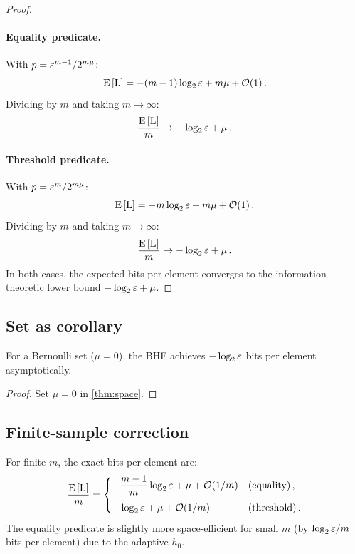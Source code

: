 \begin{proof}
\paragraph{Equality predicate.}
With $p = \varepsilon^{m-1}/2^{m\mu}$:
\begin{equation}
    \Expect{\RV{L}}
        = -(m-1)\log_2 \fprate + m\mu + \mathcal{O}(1)\,.
\end{equation}
Dividing by $m$ and taking $m \to \infty$:
\begin{equation}
    \frac{\Expect{\RV{L}}}{m} \to -\log_2 \fprate + \mu\,.
\end{equation}

\paragraph{Threshold predicate.}
With $p = \varepsilon^{m}/2^{m\mu}$:
\begin{equation}
    \Expect{\RV{L}}
        = -m\log_2 \fprate + m\mu + \mathcal{O}(1)\,.
\end{equation}
Dividing by $m$ and taking $m \to \infty$:
\begin{equation}
    \frac{\Expect{\RV{L}}}{m} \to -\log_2 \fprate + \mu\,.
\end{equation}
In both cases, the expected bits per element converges to the information-theoretic lower bound $-\log_2 \varepsilon + \mu$.
\end{proof}

\subsection{Set as corollary}

\begin{corollary}
\label{cor:set_space}
For a Bernoulli set ($\mu = 0$), the BHF achieves $-\log_2 \varepsilon$ bits per
element asymptotically.
\end{corollary}
\begin{proof}
Set $\mu = 0$ in \cref{thm:space}.
\end{proof}

\subsection{Finite-sample correction}

For finite $m$, the exact bits per element are:
\begin{equation}
    \frac{\Expect{\RV{L}}}{m} =
    \begin{cases}
        -\dfrac{m-1}{m}\log_2 \fprate + \mu + \mathcal{O}(1/m)
            & \text{(equality)}\,,\\[8pt]
        -\log_2 \fprate + \mu + \mathcal{O}(1/m)
            & \text{(threshold)}\,.
    \end{cases}
\end{equation}
The equality predicate is slightly more space-efficient for small $m$
(by $\log_2 \varepsilon / m$ bits per element) due to the adaptive $h_0$.

